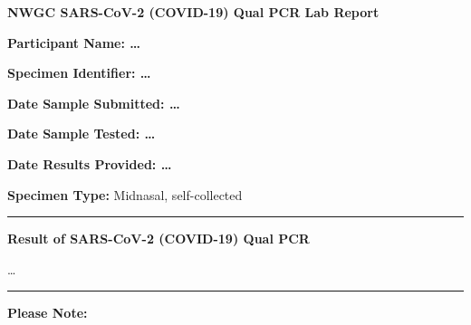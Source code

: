 \documentclass[10pt]{article}
\newcommand{\PageLine}{\rule{\textwidth}{0.25mm}}
\begin{document}
\begin{center}
\Large
\textbf{NWGC SARS-CoV-2 (COVID-19) Qual PCR Lab Report}
\end{center}

\bigskip
\textbf{Participant Name: …}

\textbf{Specimen Identifier: …}

\textbf{Date Sample Submitted: …}

\textbf{Date Sample Tested: …}

\textbf{Date Results Provided: …}

\textbf{Specimen Type:} Midnasal, self-collected

\PageLine

\textbf{Result of SARS-CoV-2 (COVID-19) Qual PCR}

…

\PageLine

\textbf{Please Note:}
\end{document}
